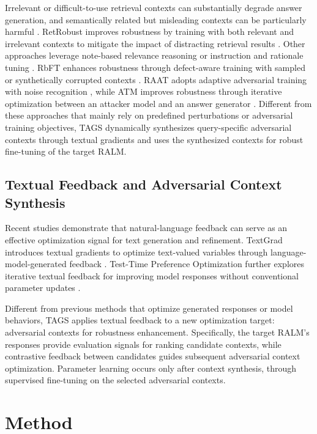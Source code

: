 \documentclass[11pt]{article}
\begin{document}
Irrelevant or difficult-to-use retrieval contexts can substantially degrade answer generation, and semantically related but misleading contexts can be particularly harmful \cite{shi2023large,cuconasu2024power,amiraz-etal-2025-distracting}. 
RetRobust improves robustness by training with both relevant and irrelevant contexts to mitigate the impact of distracting retrieval results \cite{yoran2023making}. 
Other approaches leverage note-based relevance reasoning \cite{CoN} or instruction and rationale tuning \cite{instructrag}. 
RbFT enhances robustness through defect-aware training with sampled or synthetically corrupted contexts \cite{RbFT}. 
RAAT adopts adaptive adversarial training with noise recognition \cite{RAAT}, while ATM improves robustness through iterative optimization between an attacker model and an answer generator \cite{ATM}. 
Different from these approaches that mainly rely on predefined perturbations or adversarial training objectives, TAGS dynamically synthesizes query-specific adversarial contexts through textual gradients and uses the synthesized contexts for robust fine-tuning of the target RALM.


\subsection{Textual Feedback and Adversarial Context Synthesis}

Recent studies demonstrate that natural-language feedback can serve as an effective optimization signal for text generation and refinement. 
TextGrad introduces textual gradients to optimize text-valued variables through language-model-generated feedback \cite{textgrad}. 
Test-Time Preference Optimization further explores iterative textual feedback for improving model responses without conventional parameter updates \cite{tpo}.

Different from previous methods that optimize generated responses or model behaviors, TAGS applies textual feedback to a new optimization target: adversarial contexts for robustness enhancement. 
Specifically, the target RALM's responses provide evaluation signals for ranking candidate contexts, while contrastive feedback between candidates guides subsequent adversarial context optimization. 
Parameter learning occurs only after context synthesis, through supervised fine-tuning on the selected adversarial contexts.
\section{Method}
\end{document}
